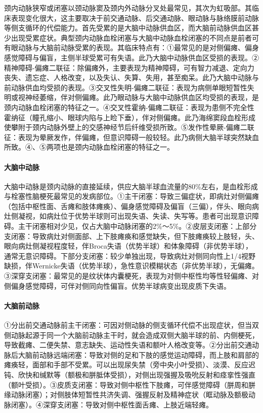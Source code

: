 颈内动脉狭窄或闭塞以颈动脉窦及颈内外动脉分叉处最常见，其次为虹吸部。其临床表现变化很大，这主要取决于前交通动脉、后交通动脉、眼动脉与脉络膜前动脉等侧支循环的代偿能力。首先受累的是大脑中动脉供血区，而大脑前动脉供血区甚少出现受累症状。典型颈内动脉血栓闭塞与大脑中动脉血栓闭塞的不同点是前者可有眼动脉与大脑前动脉受累的表现。其临床特点有：①最常见的是对侧偏瘫、偏身感觉障碍与偏盲，主侧半球受累可有失语。此乃大脑中动脉供血区受损的表现。②精神障碍-偏瘫二联征：除偏瘫外，主要表现为精神障碍，可有智力减退、定向力丧失、遗忘症、人格改变，以及失认、失算、失用，甚至痴呆。此乃大脑中动脉与前动脉供血均受损的表现。③交叉性失明-偏瘫二联征：表现为病侧单眼短暂性失明或视神经萎缩，伴对侧偏瘫。此乃眼动脉与大脑中动脉供血区均受损的表现，是颈内动脉血栓闭塞的特征之一。④交叉性霍纳-偏瘫二联征：表现为患侧不完全性霍纳征（瞳孔缩小、眼球内陷与上睑下垂），伴对侧偏瘫。此乃海绵窦段血栓形成使攀附于颈内动脉外壁上的交感神经节后纤维受损所致。⑤发作性晕厥-偏瘫二联征：表现为晕厥发作，伴偏瘫，但意识障碍一般较轻。此乃病侧大脑半球突然缺血所致。④、⑤两项也是颈内动脉血栓闭塞的特征之一。

\paragraph{大脑中动脉}

大脑中动脉是颈内动脉的直接延续，供应大脑半球血流量的80\%左右，是血栓形成与栓塞性脑梗死最常见的发病部位。①主干闭塞：导致三偏症状，即病灶对侧偏瘫（包括中枢性面、舌瘫和肢体瘫痪）、偏身感觉障碍及偏盲（三偏），伴头、眼向病灶侧凝视，如病灶位于优势半球则可出现失语、失读、失写等。患者可出现意识障碍。主干闭塞相对少见，仅占大脑中动脉闭塞的2\%～5\%。②皮层支闭塞：上部分支闭塞：导致病灶对侧面部、上下肢瘫痪和感觉缺失，但下肢瘫痪较上肢轻，头、眼向病灶侧凝视程度轻，伴Broca失语（优势半球）和体象障碍（非优势半球），通常无意识障碍。下部分支闭塞：较少单独出现，导致病灶对侧同向性上1/4视野缺损，伴Wernicke失语（优势半球），急性意识模糊状态（非优势半球），无偏瘫。③深穿支闭塞：最常见的是纹状体内囊梗死，表现为对侧中枢性均等性轻偏瘫、对侧偏身感觉障碍，可伴对侧同向性偏盲。优势半球病变出现皮质下失语。

\paragraph{大脑前动脉}

①分出前交通动脉前主干闭塞：可因对侧动脉的侧支循环代偿不出现症状，但当双侧动脉起源于同一个大脑前动脉主干时，就会造成双侧大脑半球的前、内侧梗死，导致截瘫、二便失禁、意志缺失、运动性失语和额叶人格改变等。②分出前交通动脉后大脑前动脉远端闭塞：导致对侧的足和下肢的感觉运动障碍，而上肢和肩部的瘫痪轻，面部和手部不受累。可以出现尿失禁（旁中央小叶受损）、淡漠、反应迟钝、欣快和缄默等（额极和胼胝体受损），对侧出现强握及吸吮反射和痉挛性强直（额叶受损）。③皮质支闭塞：导致对侧中枢性下肢瘫，可伴感觉障碍（胼周和胼缘动脉闭塞）；对侧肢体短暂性共济失调、强握反射及精神症状（眶动脉及额极动脉闭塞）。④深穿支闭塞：导致对侧中枢性面舌瘫、上肢近端轻瘫。

